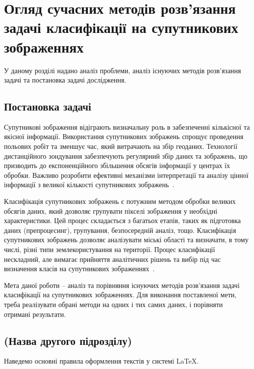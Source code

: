 
\chapter{Огляд сучасних методів розв’язання задачі класифікації на супутникових зображеннях}
\label{chap:review}  %

У даному розділі надано аналіз проблеми, аналіз існуючих методів розв'язання задачі та постановка
задачі дослідження.

\section{Постановка задачі}

Супутникові зображення відіграють визначальну роль в забезпеченні кількісної та якісної інформації.
Використання супутникових зображень спрощує проведення польових робіт та зменшує
час, який витрачають на збір геоданих. Технології дистанційного зондування забезпечують регулярний
збір даних та зображень, що призводить до експоненційного збільшення обсягів інформації
у центрах їх обробки. Важливо розробити ефективні механізми інтерпретації та аналізу
цінної інформації з великої кількості супутникових зображень~\cite{abburu2015}.

Класифікація супутникових зображень є потужним методом обробки великих обсягів даних,
який дозволяє групувати пікселі зображення у необхідні характеристики. Цей процес
складається з багатьох етапів, таких як підготовка даних (препроцесинг), групування,
безпосередній аналіз, тощо.  Класифікація супутникових
зображень дозволяє аналізувати міські області та визначати, в тому числі, різні типи землекористування
на території.
Процес класифікації нескладний, але вимагає прийняття аналітичних рішень та вибір під час визначення
класів на супутникових зображеннях~\cite{abburu2015}.

Мета даної роботи -- аналіз та порівняння існуючих методів розв'язання задачі класифікації
на супутникових зображеннях. Для виконання поставленої мети, треба реалізувати обрані методи
на одних і тих самих даних, і порівняти отримані результати.

\section{(Назва другого підрозділу)}

Наведемо основні правила оформлення текстів у системі \LaTeX.

